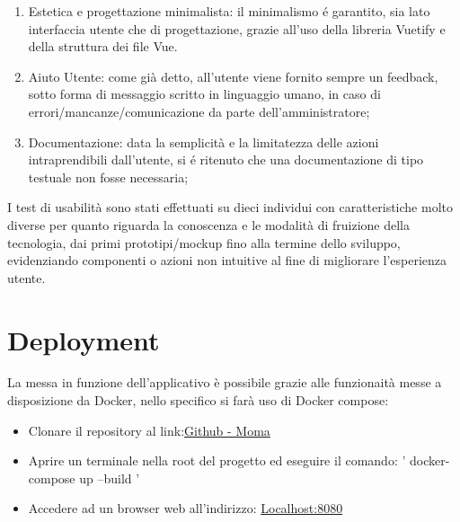 \documentclass{report}
\begin{document}
\begin{enumerate}
    \item Estetica e progettazione minimalista: il minimalismo é garantito, sia lato interfaccia utente che di progettazione, grazie all’uso della libreria Vuetify e della struttura dei file Vue.
    \item Aiuto Utente: come già detto, all’utente viene fornito sempre un feedback, sotto forma di messaggio scritto in linguaggio umano, in caso di errori/mancanze/comunicazione da parte dell’amministratore;
    \item Documentazione: data la semplicità e la limitatezza delle azioni intraprendibili dall’utente, si é ritenuto che una documentazione di tipo testuale non fosse necessaria;
\end{enumerate}
I test di usabilità sono stati effettuati su dieci individui con caratteristiche molto diverse per quanto riguarda la conoscenza e le modalità di fruizione della tecnologia, dai primi prototipi/mockup fino alla termine dello sviluppo, evidenziando componenti o azioni non intuitive al fine di migliorare l’esperienza utente.

\newpage

\section{Deployment}
La messa in funzione dell'applicativo è possibile grazie alle funzionaità messe a disposizione da Docker, nello specifico si farà uso di Docker compose:
\begin{itemize}
    \item Clonare il repository al link:\href{http://localhost:8080/}{Github - Moma}%
    \item Aprire un terminale nella root del progetto ed eseguire il comando: ' docker-compose up --build '
    \item Accedere ad un browser web all'indirizzo: \href{http://localhost:8080/}{Localhost:8080}
\end{itemize}
\newpage
\end{document}
